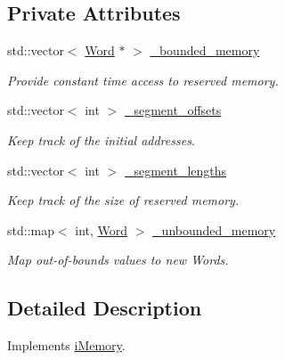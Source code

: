 \subsection*{Private Attributes}
\begin{DoxyCompactItemize}
\item 
\hypertarget{classMemory_a6391f325c42a93f4c56f0c44e6b35fda}{
std::vector$<$ \hyperlink{classWord}{Word} $\ast$ $>$ \hyperlink{classMemory_a6391f325c42a93f4c56f0c44e6b35fda}{\_\-bounded\_\-memory}}
\label{classMemory_a6391f325c42a93f4c56f0c44e6b35fda}

\begin{DoxyCompactList}\small\item\em Provide constant time access to reserved memory. \item\end{DoxyCompactList}\item 
\hypertarget{classMemory_a29d6fa2f1774f0c770130c968820d008}{
std::vector$<$ int $>$ \hyperlink{classMemory_a29d6fa2f1774f0c770130c968820d008}{\_\-segment\_\-offsets}}
\label{classMemory_a29d6fa2f1774f0c770130c968820d008}

\begin{DoxyCompactList}\small\item\em Keep track of the initial addresses. \item\end{DoxyCompactList}\item 
\hypertarget{classMemory_a3e5675ae2bc551a9c5429525e2dce857}{
std::vector$<$ int $>$ \hyperlink{classMemory_a3e5675ae2bc551a9c5429525e2dce857}{\_\-segment\_\-lengths}}
\label{classMemory_a3e5675ae2bc551a9c5429525e2dce857}

\begin{DoxyCompactList}\small\item\em Keep track of the size of reserved memory. \item\end{DoxyCompactList}\item 
\hypertarget{classMemory_a36f459f042295fb06b4d7ec9b397f952}{
std::map$<$ int, \hyperlink{classWord}{Word} $>$ \hyperlink{classMemory_a36f459f042295fb06b4d7ec9b397f952}{\_\-unbounded\_\-memory}}
\label{classMemory_a36f459f042295fb06b4d7ec9b397f952}

\begin{DoxyCompactList}\small\item\em Map out-\/of-\/bounds values to new Words. \item\end{DoxyCompactList}\end{DoxyCompactItemize}


\subsection{Detailed Description}
Implements \hyperlink{classiMemory}{iMemory}. 